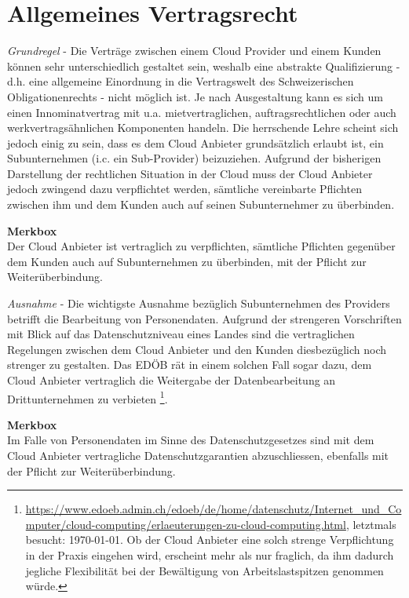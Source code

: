 \documentclass[a4paper,pointlessnumbers]{scrreprt}
\newcommand{\merkbox}[2][0.8\textwidth]{ \begin{center} \begin{tcolorbox}[enhanced, drop fuzzy midday shadow, width={#1}, opacityframe=0.5, colframe=BrickRed, colback=white] {\ECFTeenSpirit \color{BrickRed}\textbf{Merkbox} \qquad {\tiny das gilt es zu beachten}} \\  #2 \end{tcolorbox} \end{center}}
\begin{document}
\pagebreak

\section{Allgemeines Vertragsrecht}
\textit{Grundregel} - Die Verträge zwischen einem Cloud Provider und einem Kunden können sehr unterschiedlich gestaltet sein, weshalb eine abstrakte Qualifizierung - d.h. eine allgemeine Einordnung in die Vertragswelt des Schweizerischen Obligationenrechts - nicht möglich ist.  Je nach Ausgestaltung kann es sich um einen Innominatvertrag mit u.a. mietvertraglichen, auftragsrechtlichen oder auch werkvertragsähnlichen Komponenten handeln. Die herrschende Lehre scheint sich jedoch einig zu sein, dass es dem Cloud Anbieter grundsätzlich erlaubt ist, ein Subunternehmen (i.c. ein Sub-Provider) beizuziehen. Aufgrund der bisherigen Darstellung der rechtlichen Situation in der Cloud muss der Cloud Anbieter jedoch zwingend dazu verpflichtet werden, sämtliche vereinbarte Pflichten zwischen ihm und dem Kunden auch auf seinen Subunternehmer zu überbinden.

\merkbox[0.7\textwidth]{Der Cloud Anbieter ist vertraglich zu verpflichten, sämtliche Pflichten gegenüber dem Kunden auch auf Subunternehmen zu überbinden, mit der Pflicht zur Weiterüberbindung.}

\textit{Ausnahme} - Die wichtigste Ausnahme bezüglich Subunternehmen des Providers betrifft die Bearbeitung von Personendaten. Aufgrund der strengeren Vorschriften mit Blick auf das Datenschutzniveau eines Landes sind die vertraglichen Regelungen zwischen dem Cloud Anbieter und den Kunden diesbezüglich noch strenger zu gestalten. Das EDÖB rät in einem solchen Fall sogar dazu, dem Cloud Anbieter vertraglich die Weitergabe der Datenbearbeitung an Drittunternehmen zu verbieten \footnote{\href{https://www.edoeb.admin.ch/edoeb/de/home/datenschutz/Internet\_und\_Computer/cloud-computing/erlaeuterungen-zu-cloud-computing.html}{https://www.edoeb.admin.ch/edoeb/de/home/datenschutz/Internet\_und\_Computer/cloud-computing/erlaeuterungen-zu-cloud-computing.html}, letztmals besucht: \today. Ob der Cloud Anbieter eine solch strenge Verpflichtung in der Praxis eingehen wird, erscheint mehr als nur fraglich, da ihm dadurch jegliche Flexibilität bei der Bewältigung von Arbeitslastspitzen genommen würde.}.

\merkbox[0.7\textwidth]{Im Falle von Personendaten im Sinne des Datenschutzgesetzes sind mit dem Cloud Anbieter vertragliche Datenschutzgarantien abzuschliessen, ebenfalls mit der Pflicht zur Weiterüberbindung.}
\end{document}
